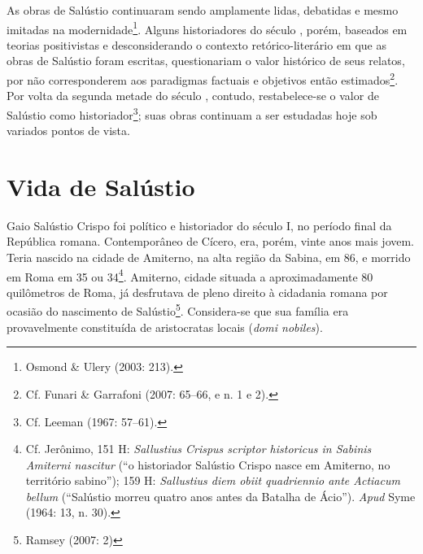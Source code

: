 As
obras de Salústio continuaram sendo amplamente lidas, debatidas e mesmo
imitadas na modernidade\footnote{Osmond \& Ulery (2003: 213).}. Alguns
historiadores do século , porém, baseados em teorias positivistas e
desconsiderando o contexto retórico-literário em que as obras de Salústio foram
escritas, questionariam o valor histórico de seus relatos, por não
corresponderem aos paradigmas factuais e objetivos então estimados\footnote{Cf. Funari \& Garrafoni (2007: 65--66, e n. 1 e 2).}.  Por volta da segunda
  metade do século , contudo, restabelece-se o valor de Salústio
  como historiador\footnote{Cf. Leeman (1967: 57--61).}; suas obras
  continuam a ser estudadas hoje sob variados pontos de vista.


\section{Vida de Salústio}

Gaio Salústio Crispo foi político e historiador do século I, no período
final da República romana.  Contemporâneo de Cícero, era, porém, vinte anos
mais jovem. Teria nascido na cidade de Amiterno, na alta região da Sabina, em
86, e morrido em Roma em 35 ou 34\footnote{Cf. Jerônimo,  151 H:
\emph{Sallustius Crispus scriptor historicus in Sabinis Amiterni nascitur} (``o historiador Salústio Crispo nasce em Amiterno, no território sabino''); 
159 H: \emph{Sallustius diem obiit quadriennio ante Actiacum bellum} (``Salústio morreu quatro anos antes da Batalha de Ácio'').
\emph{Apud} Syme (1964:  13, n. 30).}. Amiterno, cidade situada
a aproximadamente 80 quilômetros de Roma, já desfrutava de pleno direito à
cidadania romana por ocasião do nascimento de Salústio\footnote{Ramsey (2007: 2)}. Considera-se que sua família era provavelmente constituída de
aristocratas locais (\emph{domi nobiles}). 

